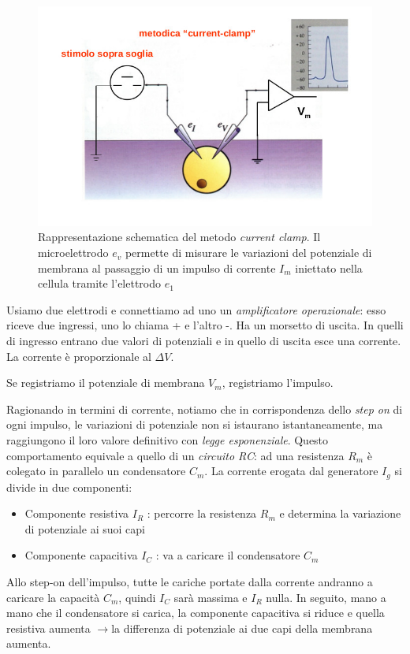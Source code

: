 \documentclass[a4paper,12pt]{article}
\newcommand{\lfreccia}{\ensuremath{\longrightarrow}}
\begin{document}
\begin{figure}[H]
\centering
\includegraphics[scale=0.4]{immagine/cc.jpg}
\caption{Rappresentazione schematica del metodo \emph{current clamp}. Il microelettrodo $e_{v}$ permette di misurare le variazioni del potenziale di membrana al passaggio di un impulso di corrente $I_{m}$ iniettato nella cellula tramite l'elettrodo $e_{1}$}
\end{figure}
Usiamo due elettrodi e connettiamo ad uno un \emph{amplificatore operazionale}: esso riceve due ingressi, uno lo chiama + e l'altro -. Ha un morsetto di uscita. In quelli di ingresso entrano due valori di potenziali e in quello di uscita esce una corrente. La corrente è proporzionale al $\Delta V$.

Se registriamo il potenziale di membrana $V_{m}$, registriamo l'impulso.

Ragionando in termini di corrente, notiamo che in corrispondenza dello \emph{step on} di ogni impulso, le variazioni di potenziale non si istaurano istantaneamente, ma raggiungono il loro valore definitivo con \emph{legge esponenziale}.
Questo comportamento equivale a quello di un \emph{circuito RC}: ad una resistenza $R_{m}$ è colegato in parallelo un condensatore $C_{m}$. La corrente erogata dal generatore $I_{g}$ si divide in due componenti:
\begin{itemize}
\item{Componente resistiva $I_{R}$ : percorre la resistenza $R_{m}$ e determina la variazione di potenziale ai suoi capi}
\item{Componente capacitiva $I_{C}$ : va a caricare il condensatore $C_{m}$}
\end{itemize}

Allo step-on dell'impulso, tutte le cariche portate dalla corrente andranno a caricare la capacità $C_{m}$, quindi $I_{C}$ sarà massima e $I_{R}$ nulla. In seguito, mano a mano che il condensatore si carica, la componente capacitiva si riduce e quella resistiva aumenta \lfreccia la differenza di potenziale ai due capi della membrana aumenta.
\end{document}
